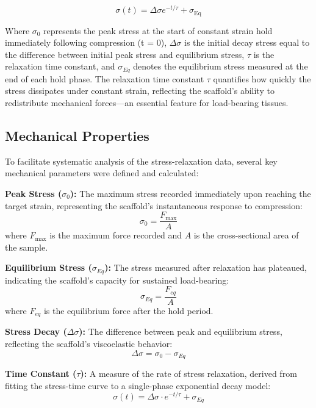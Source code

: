 \begin{equation}
\sigma(t) = \Delta \sigma e^{-t / \tau} + \sigma_{\text{Eq}}
\end{equation}

Where $\sigma_{0}$ represents the peak stress at the start of constant strain hold immediately following compression (t = 0), $\Delta\sigma$ is the initial decay stress equal to the difference between initial peak stress and equilibrium stress, $\tau$ is the relaxation time constant, and $\sigma_{Eq}$ denotes the equilibrium stress measured at the end of each hold phase. The relaxation time constant $\tau$ quantifies how quickly the stress dissipates under constant strain, reflecting the scaffold's ability to redistribute mechanical forces—an essential feature for load-bearing tissues.

\subsection{Mechanical Properties}

To facilitate systematic analysis of the stress-relaxation data, several key mechanical parameters were defined and calculated:

\textbf{Peak Stress ($\sigma_0$):} The maximum stress recorded immediately upon reaching the target strain, representing the scaffold's instantaneous response to compression:
\begin{equation}
\sigma_0 = \frac{F_{\max}}{A}
\end{equation}
where $F_{\max}$ is the maximum force recorded and $A$ is the cross-sectional area of the sample.

\textbf{Equilibrium Stress ($\sigma_{Eq}$):} The stress measured after relaxation has plateaued, indicating the scaffold's capacity for sustained load-bearing:
\begin{equation}
\sigma_{Eq} = \frac{F_{eq}}{A}
\end{equation}
where $F_{eq}$ is the equilibrium force after the hold period.

\textbf{Stress Decay ($\Delta\sigma$):} The difference between peak and equilibrium stress, reflecting the scaffold's viscoelastic behavior:
\begin{equation}
\Delta\sigma = \sigma_0 - \sigma_{Eq}
\end{equation}

\textbf{Time Constant ($\tau$):} A measure of the rate of stress relaxation, derived from fitting the stress-time curve to a single-phase exponential decay model:
\begin{equation}
\sigma(t) = \Delta\sigma \cdot e^{-t/\tau} + \sigma_{Eq}
\end{equation}

